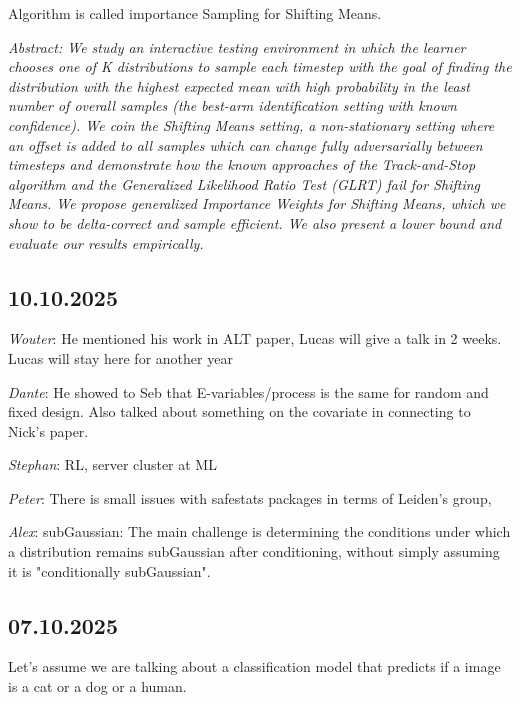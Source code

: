 Algorithm is called importance Sampling for Shifting Means.

\textit{
	Abstract: We study an interactive testing environment in which the learner chooses one of K distributions to sample each timestep with the goal of finding the distribution with the highest expected mean with high probability in the least number of overall samples (the best-arm identification setting with known confidence). We coin the Shifting Means setting, a non-stationary setting where an offset is added to all samples which can change fully adversarially between timesteps and demonstrate how the known approaches of the Track-and-Stop algorithm and the Generalized Likelihood Ratio Test (GLRT) fail for Shifting Means. We propose generalized Importance Weights for Shifting Means, which we show to be delta-correct and sample efficient. We also present a lower bound and evaluate our results empirically.
}
\subsection*{10.10.2025}

\emph{Wouter}: He mentioned his work in ALT paper, Lucas will give a talk in 2 weeks.
Lucas will stay here for another year

\emph{Dante}: He showed to Seb that E-variables/process is the same for
random and fixed design. Also talked about something on the covariate in
connecting to Nick's paper.

\emph{Stephan}: RL, server cluster at ML

\emph{Peter}: There is small issues with safestats packages in terms of
Leiden's group,

\emph{Alex}: subGaussian: The main challenge is determining the conditions under which a distribution remains subGaussian after conditioning, without simply assuming it is "conditionally subGaussian".

\subsection*{07.10.2025}

Let's assume we are talking about a classification model that predicts if
a image is a cat or a dog or a human.

